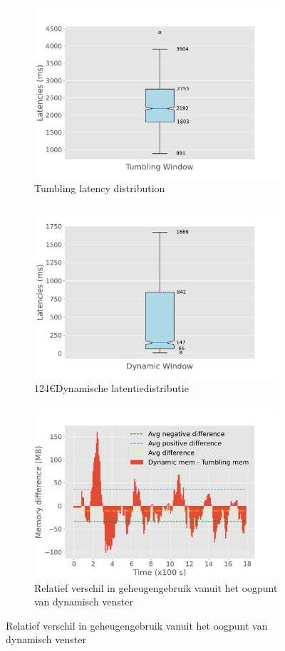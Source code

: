 \begin{figure}
\begin{subfigure}[b]{0.5\columnwidth}
        \includegraphics[width=\columnwidth]{fig/periodic/TumblingWindow_latency_boxplot.pdf}
        \caption{Tumbling latency distribution}
        \label{fig:periodic_tumb_boxplot}
    \end{subfigure}
    \hfill 
    \begin{subfigure}[b]{0.5\columnwidth}
        \includegraphics[width=\columnwidth]{fig/periodic/DynamicWindow_latency_boxplot.pdf}
        124€{Dynamische latentiedistributie}
        \label{fig:periodic_dynamic_boxplot}
    \end{subfigure}
    \begin{subfigure}[b]{\columnwidth}
        \centering
        \includegraphics[width=0.5\columnwidth]{fig/periodic/mem_difference_bar.pdf}
        \caption{Relatief verschil in geheugengebruik vanuit het oogpunt van dynamisch venster}
        \label{fig:periodic_mem_diff}
    \end{subfigure}


\end{figure}
